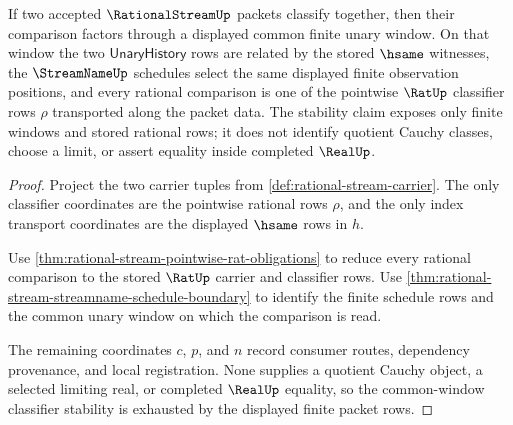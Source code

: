 \begin{theorem}
\label{thm:rational-stream-common-window-classifier-stability}
If two accepted $\RationalStreamUp$ packets classify together, then their
comparison factors through a displayed common finite unary window. On that
window the two $\mathsf{UnaryHistory}$ rows are related by the stored
$\hsame$ witnesses, the $\StreamNameUp$ schedules select the same displayed
finite observation positions, and every rational comparison is one of the
pointwise $\RatUp$ classifier rows $\rho$ transported along the packet data.
The stability claim exposes only finite windows and stored rational rows; it
does not identify quotient Cauchy classes, choose a limit, or assert equality
inside completed $\RealUp$.
\end{theorem}
\begin{proof}
Project the two carrier tuples from \autoref{def:rational-stream-carrier}.
The only classifier coordinates are the pointwise rational rows $\rho$, and
the only index transport coordinates are the displayed $\hsame$ rows in $h$.

Use \autoref{thm:rational-stream-pointwise-rat-obligations} to reduce every
rational comparison to the stored $\RatUp$ carrier and classifier rows. Use
\autoref{thm:rational-stream-streamname-schedule-boundary} to identify the
finite schedule rows and the common unary window on which the comparison is
read.

The remaining coordinates $c$, $p$, and $n$ record consumer routes,
dependency provenance, and local registration. None supplies a quotient
Cauchy object, a selected limiting real, or completed $\RealUp$ equality, so
the common-window classifier stability is exhausted by the displayed finite
packet rows.
\end{proof}


